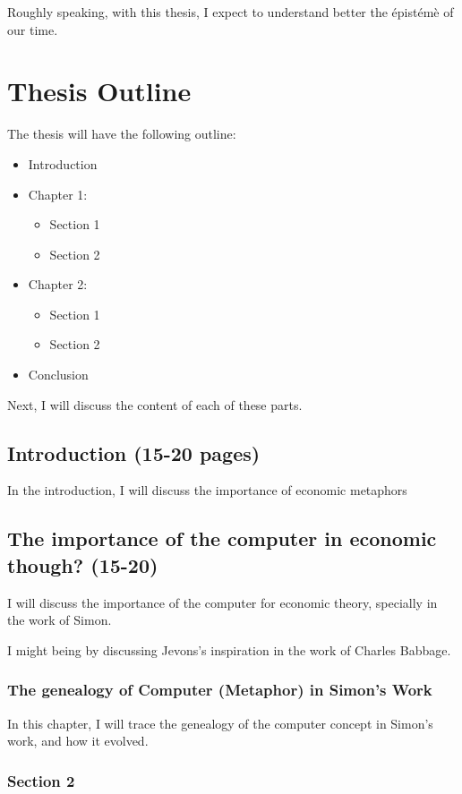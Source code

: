 \documentclass[draft=false, paper=A4,portrait,twoside=true,twocolumn=false,headinclude=false,footinclude=false,fontsize=11,BCOR=15mm,DIV=calc,pagesize=auto,titlepage=firstiscover,mpinclude=true,headings=big,headings=twolinechapter,open=right,chapterprefix=false,headsepline=false,parskip=full]{scrbook}
\begin{document}
Roughly speaking, with this thesis, I expect to understand better the
épistémè of our time.

\section{Thesis Outline}
\label{sec:org7345118}
The thesis will have the following outline:

\begin{itemize}
\item Introduction
\item Chapter 1:
\begin{itemize}
\item Section 1
\item Section 2
\end{itemize}
\item Chapter 2:
\begin{itemize}
\item Section 1
\item Section 2
\end{itemize}
\item Conclusion
\end{itemize}

Next, I will discuss the content of each of these parts. 
\subsection{Introduction (15-20 pages)}
\label{sec:org4c58124}
In the introduction, I will discuss the importance of economic metaphors
\subsection{The importance of the computer in economic though? (15-20)}
\label{sec:org37d4521}
I will discuss the importance of the computer for economic theory, specially in the work of Simon. 

I might being by discussing Jevons's inspiration in the work of Charles
Babbage.
\subsubsection{The genealogy of Computer (Metaphor) in Simon's Work}
\label{sec:orgb04a3e9}
In this chapter, I will trace the genealogy of the computer concept in
Simon's work, and how it evolved. 
\subsubsection{Section 2}
\label{sec:org634d4de}
\end{document}
